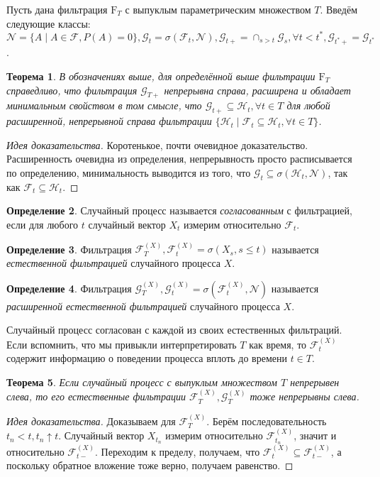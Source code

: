 \documentclass[16pt]{article}
\newtheorem{theorem}{Теорема}[section]
\theoremstyle{definition}
\newtheorem{definition}[theorem]{Определение}
\begin{document}
Пусть дана фильтрация $\mathrm{F}_T$ с выпуклым параметрическим множеством $T$. Введём следующие классы: $\mathcal{N} = \{A \mid A \in \mathcal{F}, P(A) = 0\}, \mathcal{G}_t = \sigma(\mathcal{F}_t, \mathcal{N}), \mathcal{G}_{t+} = \cap_{s > t} \mathcal{G}_s, \forall t < t^*, \mathcal{G}_{t^*+} = \mathcal{G}_{t^*}$.
\begin{theorem}
В обозначениях выше, для определённой выше фильтрации $\mathrm{F}_T$ справедливо, что фильтрация $\mathcal{G}_{T+}$ непрерывна справа, расширена и обладает минимальным свойством в том смысле, что $\mathcal{G}_{t+} \subseteq \mathcal{H}_t, \forall t \in T$ для любой расширенной, непрерывной справа фильтрации $\{\mathcal{H}_t \mid \mathcal{F}_t \subseteq \mathcal{H}_t, \forall t \in T\}$.
\end{theorem}
\begin{proof}[Идея доказательства]
Коротенькое, почти очевидное доказательство. Расширенность очевидна из определения, непрерывность просто расписывается по определению, минимальность выводится из того, что $\mathcal{G}_t \subseteq \sigma(\mathcal{H}_t, \mathcal{N})$, так как $\mathcal{F}_t \subseteq \mathcal{H}_t$.
\end{proof}
\begin{definition}
Случайный процесс называется \textit{согласованным} с фильтрацией, если для любого $t$ случайный вектор $X_t$ измерим относительно $\mathcal{F}_t$.
\end{definition}
\begin{definition}
Фильтрация $\mathcal{F}_T^{(X)}, \mathcal{F}_t^{(X)} = \sigma(X_s, s \le t)$ называется \textit{естественной фильтрацией} случайного процесса $X$.
\end{definition}
\begin{definition}
Фильтрация $\mathcal{G}_T^{(X)}, \mathcal{G}_t^{(X)} = \sigma(\mathcal{F}_t^{(X)}, \mathcal{N})$ называется \textit{расширенной естественной фильтрацией} случайного процесса $X$.
\end{definition}
Случайный процесс согласован с каждой из своих естественных фильтраций. Если вспомнить, что мы привыкли интерпретировать $T$ как время, то $\mathcal{F}_t^{(X)}$ содержит информацию о поведении процесса вплоть до времени $t \in T$.
\begin{theorem}
Если случайный процесс с выпуклым множеством $T$ непрерывен слева, то его естественные фильтрации $\mathcal{F}_T^{(X)}, \mathcal{G}_T^{(X)}$ тоже непрерывны слева.
\end{theorem}
\begin{proof}[Идея доказательства]
Доказываем для $\mathcal{F}_T^{(X)}$. Берём последовательность $t_n < t, t_n \uparrow t$. Случайный вектор $X_{t_n}$ измерим относительно $\mathcal{F}_{t_n}^{(X)}$, значит и относительно $\mathcal{F}_{t-}^{(X)}$. Переходим к пределу, получаем, что $\mathcal{F}_t^{(X)} \subseteq \mathcal{F}_{t-}^{(X)}$, а поскольку обратное вложение тоже верно, получаем равенство. 
\end{proof}
\end{document}
